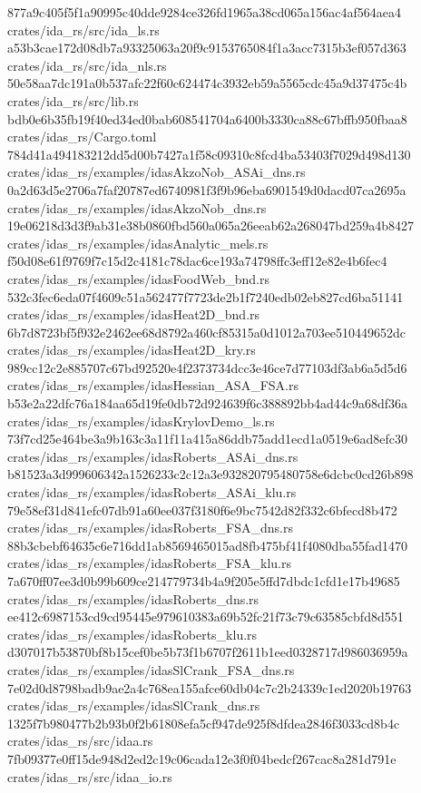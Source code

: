 \documentclass[
  10pt,
]{article}
\newenvironment{Shaded}{}{}
\newcommand{\NormalTok}[1]{#1}
\begin{document}
\begin{Shaded}
\begin{Highlighting}[]
\NormalTok{877a9c405f5f1a90995c40dde9284ce326fd1965a38cd065a156ac4af564aea4  crates/ida\_rs/src/ida\_ls.rs}
\NormalTok{a53b3cae172d08db7a93325063a20f9c9153765084f1a3acc7315b3ef057d363  crates/ida\_rs/src/ida\_nls.rs}
\NormalTok{50e58aa7dc191a0b537afc22f60c624474c3932eb59a5565cdc45a9d37475c4b  crates/ida\_rs/src/lib.rs}
\NormalTok{bdb0e6b35fb19f40ed34ed0bab608541704a6400b3330ca88c67bffb950fbaa8  crates/idas\_rs/Cargo.toml}
\NormalTok{784d41a494183212dd5d00b7427a1f58c09310c8fcd4ba53403f7029d498d130  crates/idas\_rs/examples/idasAkzoNob\_ASAi\_dns.rs}
\NormalTok{0a2d63d5e2706a7faf20787ed6740981f3f9b96eba6901549d0dacd07ca2695a  crates/idas\_rs/examples/idasAkzoNob\_dns.rs}
\NormalTok{19e06218d3d3f9ab31e38b0860fbd560a065a26eeab62a268047bd259a4b8427  crates/idas\_rs/examples/idasAnalytic\_mels.rs}
\NormalTok{f50d08e61f9769f7c15d2c4181c78dac6ce193a74798ffc3eff12e82e4b6fec4  crates/idas\_rs/examples/idasFoodWeb\_bnd.rs}
\NormalTok{532c3fec6eda07f4609c51a562477f7723de2b1f7240edb02eb827cd6ba51141  crates/idas\_rs/examples/idasHeat2D\_bnd.rs}
\NormalTok{6b7d8723bf5f932e2462ee68d8792a460cf85315a0d1012a703ee510449652dc  crates/idas\_rs/examples/idasHeat2D\_kry.rs}
\NormalTok{989cc12c2e885707c67bd92520e4f2373734dcc3e46ce7d77103df3ab6a5d5d6  crates/idas\_rs/examples/idasHessian\_ASA\_FSA.rs}
\NormalTok{b53e2a22dfc76a184aa65d19fe0db72d924639f6c388892bb4ad44c9a68df36a  crates/idas\_rs/examples/idasKrylovDemo\_ls.rs}
\NormalTok{73f7cd25e464be3a9b163c3a11f11a415a86ddb75add1ecd1a0519e6ad8efc30  crates/idas\_rs/examples/idasRoberts\_ASAi\_dns.rs}
\NormalTok{b81523a3d999606342a1526233c2c12a3e932820795480758e6dcbc0cd26b898  crates/idas\_rs/examples/idasRoberts\_ASAi\_klu.rs}
\NormalTok{79e58ef31d841efc07db91a60ee037f3180f6e9bc7542d82f332c6bfecd8b472  crates/idas\_rs/examples/idasRoberts\_FSA\_dns.rs}
\NormalTok{88b3cbebf64635c6e716dd1ab8569465015ad8fb475bf41f4080dba55fad1470  crates/idas\_rs/examples/idasRoberts\_FSA\_klu.rs}
\NormalTok{7a670ff07ee3d0b99b609ce214779734b4a9f205e5ffd7dbdc1cfd1e17b49685  crates/idas\_rs/examples/idasRoberts\_dns.rs}
\NormalTok{ee412c6987153cd9cd95445e979610383a69b52fc21f73c79c63585cbfd8d551  crates/idas\_rs/examples/idasRoberts\_klu.rs}
\NormalTok{d307017b53870bf8b15cef0be5b73f1b6707f2611b1eed0328717d986036959a  crates/idas\_rs/examples/idasSlCrank\_FSA\_dns.rs}
\NormalTok{7e02d0d8798badb9ae2a4c768ea155afce60db04c7c2b24339c1ed2020b19763  crates/idas\_rs/examples/idasSlCrank\_dns.rs}
\NormalTok{1325f7b980477b2b93b0f2b61808efa5cf947de925f8dfdea2846f3033cd8b4c  crates/idas\_rs/src/idaa.rs}
\NormalTok{7fb09377e0ff15de948d2ed2c19c06cada12e3f0f04bedcf267cac8a281d791e  crates/idas\_rs/src/idaa\_io.rs}

\end{Highlighting}
\end{Shaded}
\end{document}
